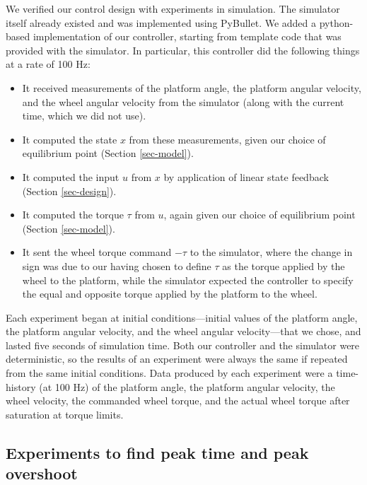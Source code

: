 \documentclass[conf]{new-aiaa}
\begin{document}
We verified our control design with experiments in simulation.
The simulator itself already existed and was implemented using PyBullet\cite{coumans2021}.
We added a python-based implementation of our controller, starting from template code that was provided with the simulator\cite{ae353software}.
In particular, this controller did the following things at a rate of 100 Hz:
\begin{itemize}

\item It received measurements of the platform angle, the platform angular velocity, and the wheel angular velocity from the simulator (along with the current time, which we did not use).

\item It computed the state $x$ from these measurements, given our choice of equilibrium point (Section \ref{sec-model}).

\item It computed the input $u$ from $x$ by application of linear state feedback (Section \ref{sec-design}).

\item It computed the torque $\tau$ from $u$, again given our choice of equilibrium point (Section \ref{sec-model}).

\item It sent the wheel torque command $-\tau$ to the simulator, where the change in sign was due to our having chosen to define $\tau$ as the torque applied by the wheel to the platform, while the simulator expected the controller to specify the equal and opposite torque applied by the platform to the wheel.

\end{itemize}
Each experiment began at initial conditions---initial values of the platform angle, the platform angular velocity, and the wheel angular velocity---that we chose, and lasted five seconds of simulation time. Both our controller and the simulator were deterministic, so the results of an experiment were always the same if repeated from the same initial conditions. Data produced by each experiment were a time-history (at 100 Hz) of the platform angle, the platform angular velocity, the wheel velocity, the commanded wheel torque, and the actual wheel torque after saturation at torque limits.

\subsection{Experiments to find peak time and peak overshoot}
\label{sec-peak}
\end{document}
